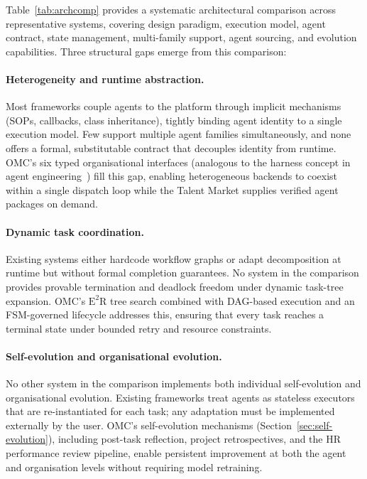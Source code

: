 \documentclass[11pt,a4paper]{article}
\begin{document}
Table~\ref{tab:archcomp} provides a systematic architectural comparison across representative systems, covering design paradigm, execution model, agent contract, state management, multi-family support, agent sourcing, and evolution capabilities.  Three structural gaps emerge from this comparison:

\paragraph{Heterogeneity and runtime abstraction.}
Most frameworks couple agents to the platform through implicit mechanisms (SOPs, callbacks, class inheritance), tightly binding agent identity to a single execution model.  Few support multiple agent families simultaneously, and none offers a formal, substitutable contract that decouples identity from runtime.  OMC's six typed organisational interfaces (analogous to the harness concept in agent engineering~\cite{anthropic2024claudecode}) fill this gap, enabling heterogeneous backends to coexist within a single dispatch loop while the Talent Market supplies verified agent packages on demand.

\paragraph{Dynamic task coordination.}
Existing systems either hardcode workflow graphs or adapt decomposition at runtime but without formal completion guarantees.  No system in the comparison provides provable termination and deadlock freedom under dynamic task-tree expansion.  OMC's $\text{E}^2$R tree search combined with DAG-based execution and an FSM-governed lifecycle addresses this, ensuring that every task reaches a terminal state under bounded retry and resource constraints.

\paragraph{Self-evolution and organisational evolution.}
No other system in the comparison implements both individual self-evolution and organisational evolution.  Existing frameworks treat agents as stateless executors that are re-instantiated for each task; any adaptation must be implemented externally by the user.  OMC's self-evolution mechanisms (Section~\ref{sec:self-evolution}), including post-task reflection, project retrospectives, and the HR performance review pipeline, enable persistent improvement at both the agent and organisation levels without requiring model retraining.
\vspace{-3pt}
\end{document}

